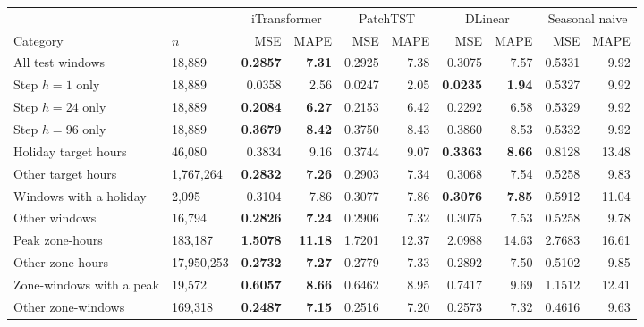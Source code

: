 {\setlength{\tabcolsep}{3pt}%
\begin{tabular}{@{}llrrrrrrrr@{}}
\toprule
 & & \multicolumn{2}{c}{iTransformer} & \multicolumn{2}{c}{PatchTST} & \multicolumn{2}{c}{DLinear} & \multicolumn{2}{c}{Seasonal naive} \\
\cmidrule(lr){3-4}\cmidrule(lr){5-6}\cmidrule(lr){7-8}\cmidrule(l){9-10}
Category & $n$ & MSE & MAPE & MSE & MAPE & MSE & MAPE & MSE & MAPE \\
\midrule
All test windows & 18{,}889 & \textbf{0.2857} & \textbf{7.31} & 0.2925 & 7.38 & 0.3075 & 7.57 & 0.5331 & 9.92 \\
\midrule
Step $h{=}1$ only & 18{,}889 & 0.0358 & 2.56 & 0.0247 & 2.05 & \textbf{0.0235} & \textbf{1.94} & 0.5327 & 9.92 \\
Step $h{=}24$ only & 18{,}889 & \textbf{0.2084} & \textbf{6.27} & 0.2153 & 6.42 & 0.2292 & 6.58 & 0.5329 & 9.92 \\
Step $h{=}96$ only & 18{,}889 & \textbf{0.3679} & \textbf{8.42} & 0.3750 & 8.43 & 0.3860 & 8.53 & 0.5332 & 9.92 \\
\midrule
Holiday target hours & 46{,}080 & 0.3834 & 9.16 & 0.3744 & 9.07 & \textbf{0.3363} & \textbf{8.66} & 0.8128 & 13.48 \\
Other target hours & 1{,}767{,}264 & \textbf{0.2832} & \textbf{7.26} & 0.2903 & 7.34 & 0.3068 & 7.54 & 0.5258 & 9.83 \\
Windows with a holiday & 2{,}095 & 0.3104 & 7.86 & 0.3077 & 7.86 & \textbf{0.3076} & \textbf{7.85} & 0.5912 & 11.04 \\
Other windows & 16{,}794 & \textbf{0.2826} & \textbf{7.24} & 0.2906 & 7.32 & 0.3075 & 7.53 & 0.5258 & 9.78 \\
\midrule
Peak zone-hours & 183{,}187 & \textbf{1.5078} & \textbf{11.18} & 1.7201 & 12.37 & 2.0988 & 14.63 & 2.7683 & 16.61 \\
Other zone-hours & 17{,}950{,}253 & \textbf{0.2732} & \textbf{7.27} & 0.2779 & 7.33 & 0.2892 & 7.50 & 0.5102 & 9.85 \\
Zone-windows with a peak & 19{,}572 & \textbf{0.6057} & \textbf{8.66} & 0.6462 & 8.95 & 0.7417 & 9.69 & 1.1512 & 12.41 \\
Other zone-windows & 169{,}318 & \textbf{0.2487} & \textbf{7.15} & 0.2516 & 7.20 & 0.2573 & 7.32 & 0.4616 & 9.63 \\
\bottomrule
\end{tabular}%
}

